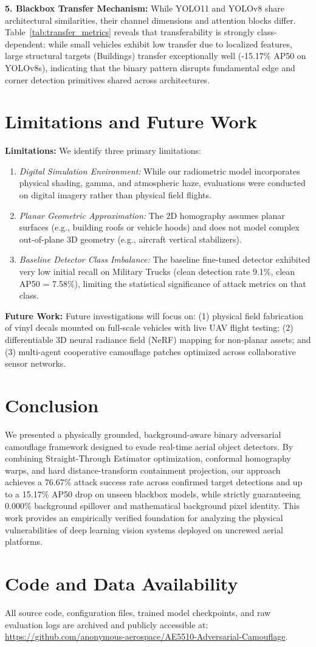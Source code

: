 \documentclass[conference]{IEEEtran}
\begin{document}
\textbf{5. Blackbox Transfer Mechanism:} While YOLO11 and YOLOv8 share architectural similarities, their channel dimensions and attention blocks differ. Table~\ref{tab:transfer_metrics} reveals that transferability is strongly class-dependent: while small vehicles exhibit low transfer due to localized features, large structural targets (Buildings) transfer exceptionally well (-15.17\% AP50 on YOLOv8s), indicating that the binary pattern disrupts fundamental edge and corner detection primitives shared across architectures.

\section{Limitations and Future Work}
\textbf{Limitations:} We identify three primary limitations:
\begin{enumerate}
    \item \textit{Digital Simulation Environment:} While our radiometric model incorporates physical shading, gamma, and atmospheric haze, evaluations were conducted on digital imagery rather than physical field flights.
    \item \textit{Planar Geometric Approximation:} The 2D homography assumes planar surfaces (e.g., building roofs or vehicle hoods) and does not model complex out-of-plane 3D geometry (e.g., aircraft vertical stabilizers).
    \item \textit{Baseline Detector Class Imbalance:} The baseline fine-tuned detector exhibited very low initial recall on Military Trucks (clean detection rate 9.1\%, clean AP50 = 7.58\%), limiting the statistical significance of attack metrics on that class.
\end{enumerate}

\textbf{Future Work:} Future investigations will focus on: (1) physical field fabrication of vinyl decals mounted on full-scale vehicles with live UAV flight testing; (2) differentiable 3D neural radiance field (NeRF) mapping for non-planar assets; and (3) multi-agent cooperative camouflage patches optimized across collaborative sensor networks.

\section{Conclusion}
We presented a physically grounded, background-aware binary adversarial camouflage framework designed to evade real-time aerial object detectors. By combining Straight-Through Estimator optimization, conformal homography warps, and hard distance-transform containment projection, our approach achieves a 76.67\% attack success rate across confirmed target detections and up to a 15.17\% AP50 drop on unseen blackbox models, while strictly guaranteeing $0.000\%$ background spillover and mathematical background pixel identity. This work provides an empirically verified foundation for analyzing the physical vulnerabilities of deep learning vision systems deployed on uncrewed aerial platforms.

\section*{Code and Data Availability}
All source code, configuration files, trained model checkpoints, and raw evaluation logs are archived and publicly accessible at: \url{https://github.com/anonymous-aerospace/AE5510-Adversarial-Camouflage}.



\end{document}
